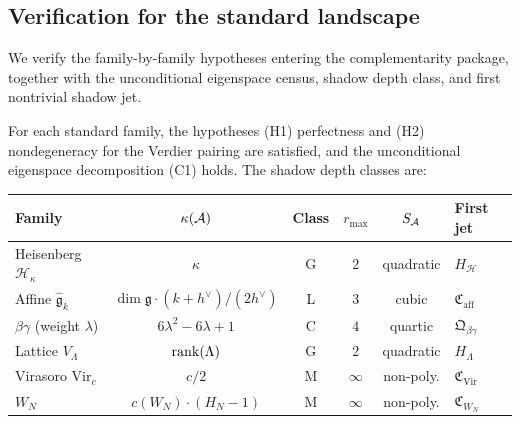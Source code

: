 %
%

\subsection{Verification for the standard landscape}
\label{subsec:thqg-III-standard-landscape}

We verify the family-by-family hypotheses entering the
complementarity package, together with the unconditional
eigenspace census, shadow depth class, and first nontrivial
shadow jet.

\begin{theorem}
\label{thm:thqg-III-landscape-census}
For each standard family, the hypotheses
\textup{(H1)} perfectness and \textup{(H2)} nondegeneracy for the
Verdier pairing are satisfied, and the unconditional eigenspace
decomposition \textup{(C1)} holds. The shadow depth classes are:

\begin{center}
\renewcommand{\arraystretch}{1.3}
\begin{tabular}{l@{\;\;}c@{\;\;}c@{\;\;}c@{\;\;}c@{\;\;}l}
\textbf{Family} & $\kappa(\mathcal{A})$ & \textbf{Class}
& $r_{\max}$ & $S_{\mathcal{A}}$ & \textbf{First jet} \\
\midrule
Heisenberg $\mathcal{H}_\kappa$
& $\kappa$ & G & $2$ & quadratic & $H_{\mathcal{H}}$
\\
Affine $\widehat{\mathfrak{g}}_k$
& $\dim\mathfrak{g}\cdot(k+h^{\vee})/(2h^{\vee})$ & L & $3$ & cubic
& $\mathfrak{C}_{\mathrm{aff}}$
\\
$\beta\gamma$ (weight $\lambda$)
& $6\lambda^2{-}6\lambda{+}1$ & C & $4$ & quartic & $\mathfrak{Q}_{\beta\gamma}$
\\
Lattice $V_\Lambda$
& $\operatorname{rank}(\Lambda)$ & G & $2$ & quadratic & $H_\Lambda$
\\
Virasoro $\mathrm{Vir}_c$
& $c/2$ & M & $\infty$ & non-poly.
& $\mathfrak{C}_{\mathrm{Vir}}$
\\
$W_N$
& $c(W_N)\cdot(H_N-1)$ & M & $\infty$ & non-poly.
& $\mathfrak{C}_{W_N}$
\\
\end{tabular}
\end{center}
\end{theorem}


